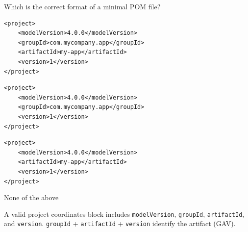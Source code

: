 \question[4]
Which is the correct format of a minimal POM file?
\begin{choices}
  \CorrectChoice
  \begin{minipage}[t]{0.88\linewidth}
\begin{lstlisting}[style=xml]
<project>
    <modelVersion>4.0.0</modelVersion>
    <groupId>com.mycompany.app</groupId>
    <artifactId>my-app</artifactId>
    <version>1</version>
</project>
\end{lstlisting}
  \end{minipage}
  \choice
  \begin{minipage}[t]{0.88\linewidth}
\begin{lstlisting}[style=xml]
<project>
    <modelVersion>4.0.0</modelVersion>
    <groupId>com.mycompany.app</groupId>
    <version>1</version>
</project>
\end{lstlisting}
  \end{minipage}
  \choice
  \begin{minipage}[t]{0.88\linewidth}
\begin{lstlisting}[style=xml]
<project>
    <modelVersion>4.0.0</modelVersion>
    <artifactId>my-app</artifactId>
    <version>1</version>
</project>
\end{lstlisting}
  \end{minipage}
  \choice None of the above
\end{choices}
\begin{solution}
  A valid project coordinates block includes \texttt{modelVersion}, \texttt{groupId}, \texttt{artifactId}, and \texttt{version}. \texttt{groupId} + \texttt{artifactId} + \texttt{version} identify the artifact (GAV).
\end{solution}

